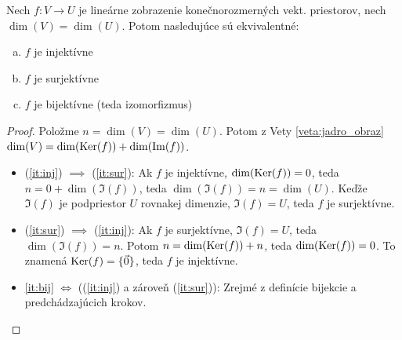\begin{dosledok} \label{dosl:ekvivalencia}
Nech $f: V \to U$ je lineárne zobrazenie konečnorozmerných vekt. priestorov, nech $\dim(V) = \dim(U)$. Potom nasledujúce sú ekvivalentné:
\begin{enumerate}[(a)]
    \item $f$ je injektívne \label{it:inj}
    \item $f$ je surjektívne \label{it:sur}
    \item $f$ je bijektívne (teda izomorfizmus) \label{it:bij}
\end{enumerate}
\end{dosledok}

\begin{proof}
Položme $n = \dim(V) = \dim(U)$. Potom z Vety \ref{veta:jadro_obraz} $\dim(V) = \dim(\operatorname{Ker}(f)) + \dim(\operatorname{Im}(f))$.
\begin{itemize}
    \item (\ref{it:inj}) $\implies$ (\ref{it:sur}): Ak $f$ je injektívne, $\dim(\operatorname{Ker}(f)) = 0$, teda $n = 0 + \dim(\Im(f))$, teda $\dim(\Im(f)) = n = \dim(U)$. Keďže $\Im(f)$ je podpriestor $U$ rovnakej dimenzie, $\Im(f) = U$, teda $f$ je surjektívne.
    \item (\ref{it:sur}) $\implies$ (\ref{it:inj}): Ak $f$ je surjektívne, $\Im(f) = U$, teda $\dim(\Im(f)) = n$. Potom $n = \dim(\operatorname{Ker}(f)) + n$, teda $\dim(\operatorname{Ker}(f)) = 0$. To znamená $\operatorname{Ker}(f) = \{ \vec{0} \}$, teda $f$ je injektívne.
    \item \ref{it:bij} $\iff$ ((\ref{it:inj}) a zároveň (\ref{it:sur})): Zrejmé z definície bijekcie a predchádzajúcich krokov.
\end{itemize}
\end{proof}

